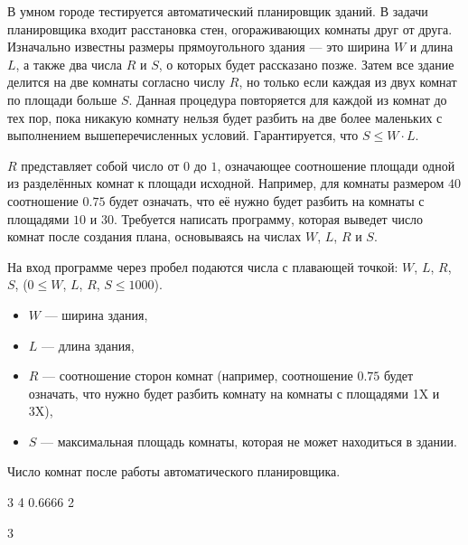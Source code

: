 
В умном городе тестируется автоматический планировщик зданий. В задачи планировщика входит расстановка стен, огораживающих комнаты друг от друга. Изначально известны размеры прямоугольного здания — это ширина $W$ и длина $L$, а также два числа $R$ и $S$, о которых будет рассказано позже. Затем все здание делится на две комнаты согласно числу $R$, но только если каждая из двух комнат по площади больше $S$. Данная процедура повторяется для каждой из комнат до тех пор, пока никакую комнату нельзя будет разбить на две более маленьких с выполнением вышеперечисленных условий. Гарантируется, что $S \leq W \cdot L$.

$R$ представляет собой число от $0$ до $1$, означающее соотношение площади одной из разделённых комнат к площади исходной. Например, для комнаты размером $40$ соотношение $0.75$ будет означать, что её нужно будет разбить на комнаты с площадями $10$ и $30$. Требуется написать программу, которая выведет число комнат после создания плана, основываясь на числах $W$, $L$, $R$ и $S$.


На вход программе через пробел подаются числа с плавающей точкой: $W$, $L$, $R$, $S$, ($0 \leq W$, $L$, $R$, $S \leq 1000$).
\begin{itemize}
    \item $W$ — ширина здания,
    \item $L$ — длина здания,
    \item $R$ — соотношение сторон комнат (например, соотношение $0.75$ будет означать, что нужно будет разбить комнату на комнаты с площадями 1X и 3X),
    \item $S$ — максимальная площадь комнаты, которая не может находиться в здании.
\end{itemize}

\outputfmtSection

Число комнат после работы автоматического планировщика.


\begin{myverbbox}[\small]{\vinput}
    3 4 0.6666 2
\end{myverbbox}
\begin{myverbbox}[\small]{\voutput}
    3
\end{myverbbox}


